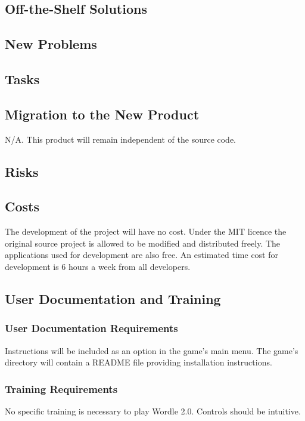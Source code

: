 \documentclass[12pt, titlepage]{article}
\begin{document}
\subsection{Off-the-Shelf Solutions}

\subsection{New Problems}

\subsection{Tasks}

\subsection{Migration to the New Product}
N/A. This product will remain independent of the source code.
\subsection{Risks}

\subsection{Costs}

The development of the project will have no cost. Under the MIT licence the original source project is allowed to be modified and distributed freely. The applications used for development are also free. An estimated time cost for development is 6 hours a week from all developers. 

\subsection{User Documentation and Training}
\subsubsection{User Documentation Requirements}
Instructions will be included as an option in the game's main menu.
The game's directory will contain a README file providing installation instructions.

\subsubsection{Training Requirements}
No specific training is necessary to play Wordle 2.0. Controls should be intuitive.
\end{document}
